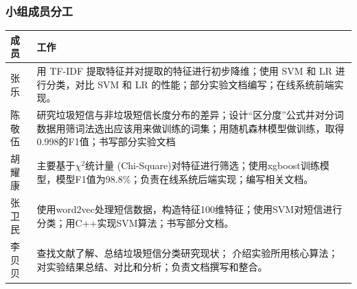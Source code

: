 \documentclass{article}
\begin{document}
\subsubsection{小组成员分工}\label{ux5c0fux7ec4ux6210ux5458ux5206ux5de5}

\begin{longtable}[]{@{}ll@{}}
\toprule
\begin{minipage}[b]{0.07\columnwidth}\raggedright\strut
成员
\strut\end{minipage} &
\begin{minipage}[b]{0.42\columnwidth}\raggedright\strut
工作
\strut\end{minipage}\tabularnewline
\midrule
\endhead
\begin{minipage}[t]{0.07\columnwidth}\raggedright\strut
张乐
\strut\end{minipage} &
\begin{minipage}[t]{0.42\columnwidth}\raggedright\strut
用 TF-IDF 提取特征并对提取的特征进行初步降维；使用 SVM 和 LR
进行分类，对比 SVM 和 LR 的性能；部分实验文档编写；在线系统前端实现。
\strut\end{minipage}\tabularnewline
\begin{minipage}[t]{0.07\columnwidth}\raggedright\strut
陈敬伍
\strut\end{minipage} &
\begin{minipage}[t]{0.42\columnwidth}\raggedright\strut
研究垃圾短信与非垃圾短信长度分布的差异；设计``区分度''公式并对分词数据用筛词法选出应该用来做训练的词集；用随机森林模型做训练，取得0.998的F1值；书写部分实验文档
\strut\end{minipage}\tabularnewline
\begin{minipage}[t]{0.07\columnwidth}\raggedright\strut
胡耀康
\strut\end{minipage} &
\begin{minipage}[t]{0.42\columnwidth}\raggedright\strut
主要基于\(\chi^2\)统计量
(Chi-Square)对特征进行筛选；使用xgboost训练模型，模型F1值为98.8\%；负责在线系统后端实现；编写相关文档。
\strut\end{minipage}\tabularnewline
\begin{minipage}[t]{0.07\columnwidth}\raggedright\strut
张卫民
\strut\end{minipage} &
\begin{minipage}[t]{0.42\columnwidth}\raggedright\strut
使用word2vec处理短信数据，构造特征100维特征；使用SVM对短信进行分类；用C++实现SVM算法；书写部分文档。
\strut\end{minipage}\tabularnewline
\begin{minipage}[t]{0.07\columnwidth}\raggedright\strut
李贝贝
\strut\end{minipage} &
\begin{minipage}[t]{0.42\columnwidth}\raggedright\strut
查找文献了解、总结垃圾短信分类研究现状；
介绍实验所用核心算法；对实验结果总结、对比和分析；负责文档撰写和整合。
\strut\end{minipage}\tabularnewline
\bottomrule
\end{longtable}
\end{document}

